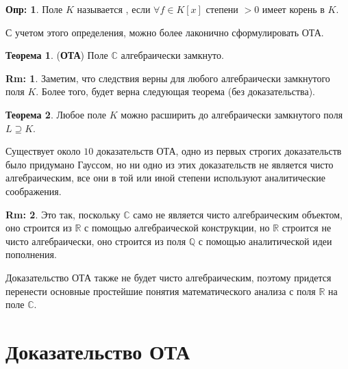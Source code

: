 \documentclass[12pt]{article}
\newcommand{\MR}{\mathbb{R}}
\newcommand{\MC}{\mathbb{C}}
\newcommand{\MQ}{\mathbb{Q}}
\theoremstyle{definition}
\newtheorem{defn}{Опр:}
\newtheorem{rem}{Rm:}
\newtheorem{theorem}{Теорема}
\begin{document}
\begin{defn}
	Поле $K$ называется , если $\forall f \in K[x]$ степени $>0$ имеет корень в $K$.
\end{defn}
С учетом этого определения, можно более лаконично сформулировать ОТА.
\begin{theorem}(\textbf{ОТА})
	Поле $\MC$ алгебраически замкнуто.
\end{theorem}
\begin{rem}
	Заметим, что следствия верны для любого алгебраически замкнутого поля $K$. Более того, будет верна следующая теорема (без доказательства).
\end{rem}
\begin{theorem}
	Любое поле $K$ можно расширить до алгебраически замкнутого поля $L \supseteq K$.
\end{theorem}
Существует около $10$ доказательств ОТА, одно из первых строгих доказательств было придумано Гауссом, но ни одно из этих доказательств не является чисто алгебраическим, все они в той или иной степени используют аналитические соображения. 
\begin{rem}
	Это так, поскольку $\MC$ само не является чисто алгебраическим объектом, оно строится из $\MR$ с помощью алгебраической конструкции, но $\MR$ строится не чисто алгебраически, оно строится из поля $\MQ$ с помощью аналитической идеи пополнения.
\end{rem}
Доказательство ОТА также не будет чисто алгебраическим, поэтому придется перенести основные простейшие понятия математического анализа с поля $\MR$ на поле $\MC$.

\newpage
\section*{Доказательство ОТА}
\end{document}
